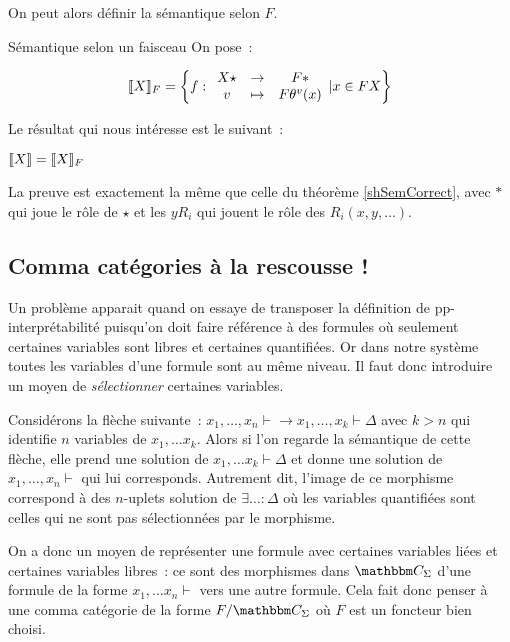 On peut alors définir la sémantique selon $F$.

\begin{defi}{Sémantique selon un faisceau}
    On pose~:

    \[\llbracket {X} \rrbracket_F = \left\{f:\begin{array}{ccc}
        X\star & \rightarrow & F\ast \\
        v      & \mapsto     & F\theta^v(x)
    \end{array} | x\in F X\right\}\]
\end{defi}

Le résultat qui nous intéresse est le suivant~:

\begin{prop}\label{shSemCorrect2}
    $\llbracket {X} \rrbracket = \llbracket {X} \rrbracket_F$
\end{prop}

\begin{pv}
    La preuve est exactement la même que celle du théorème \ref{shSemCorrect},
    avec $\ast$ qui joue le rôle de $\star$ et les $yR_i$ qui jouent le rôle
    des $R_i(x, y, \dots)$.
\end{pv}

\subsection{Comma catégories à la rescousse !}

Un problème apparait quand on essaye de transposer la définition de pp-interprétabilité
puisqu'on doit faire référence à des formules où seulement certaines variables sont
libres et certaines quantifiées. Or dans notre système toutes les variables d'une
formule sont au même niveau. Il faut donc introduire un moyen de \emph{sélectionner}
certaines variables.

Considérons la flèche suivante~:
$x_1,\dots, x_n\vdash \rightarrow x_1,\dots, x_k\vdash\Delta$ avec $k>n$ qui identifie
$n$ variables de $x_1,\dots x_k$. Alors si l'on regarde la sémantique de cette flèche,
elle prend une solution de $x_1,\dots x_k\vdash\Delta$ et donne une solution de
$x_1,\dots, x_n\vdash$ qui lui corresponds. Autrement dit, l'image de ce morphisme
correspond à des $n$-uplets solution de $\exists \dots:\Delta$ où les variables
quantifiées sont celles qui ne sont pas sélectionnées par le morphisme.

On a donc un moyen de représenter une formule avec certaines variables liées et certaines
variables libres~: ce sont des morphismes dans $\C_\Sigma$ d'une formule de la forme
$x_1,\dots x_n\vdash$ vers une autre formule. Cela fait donc penser à une comma
catégorie de la forme $F/\C_\Sigma$ où $F$ est un foncteur bien choisi.

